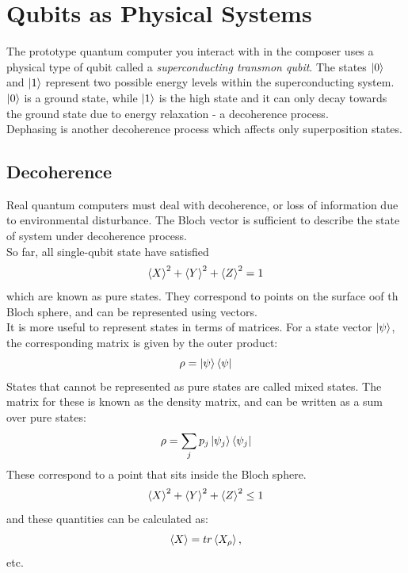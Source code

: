 \documentclass[hidelinks, a4paper, 12pt]{article}
\newcommand{\n}{\\[\baselineskip]}
\begin{document}
    \section{Qubits as Physical Systems}
    The prototype quantum computer you interact with in the composer uses a physical type of qubit called a \textit{superconducting transmon qubit}. The states $\ket{0}$ and $\ket{1}$ represent two possible energy levels within
    the superconducting system.\n
    $\ket{0}$ is a ground state, while $\ket{1}$ is the high state and it can only decay towards the ground state due to energy relaxation - a decoherence process.\n
    Dephasing is another decoherence process which affects only superposition states.

        \subsection{Decoherence}
            Real quantum computers must deal with decoherence, or loss of information due to environmental disturbance. The Bloch vector is sufficient to describe the state of system under decoherence process.\n
            So far, all single-qubit state have satisfied
            \[\braket{X}^2 + \braket{Y}^2 + \braket{Z}^2 = 1\]
            which are known as pure states. They correspond to points on the surface oof th Bloch sphere, and can be represented using vectors.\n
            It is more useful to represent states in terms of matrices. For a state vector $\ket{\psi}$, the corresponding matrix is given by the outer product:
            \[\rho = \ket{\psi}\bra{\psi}\]
            States that cannot be represented as pure states are called mixed states. The matrix for these is known as the density matrix, and can be written as a sum over pure states:
            \[\rho = \sum_{j}p_j\ket{\psi_j}\bra{\psi_j}\]
            These correspond to a point that sits inside the Bloch sphere.
            \[\braket{X}^2 + \braket{Y}^2 + \braket{Z}^2 \leq 1\]
            and these quantities can be calculated as:
            \[\braket{X} = tr\braket{X_\rho},\]
            etc.
    
    
\end{document}

